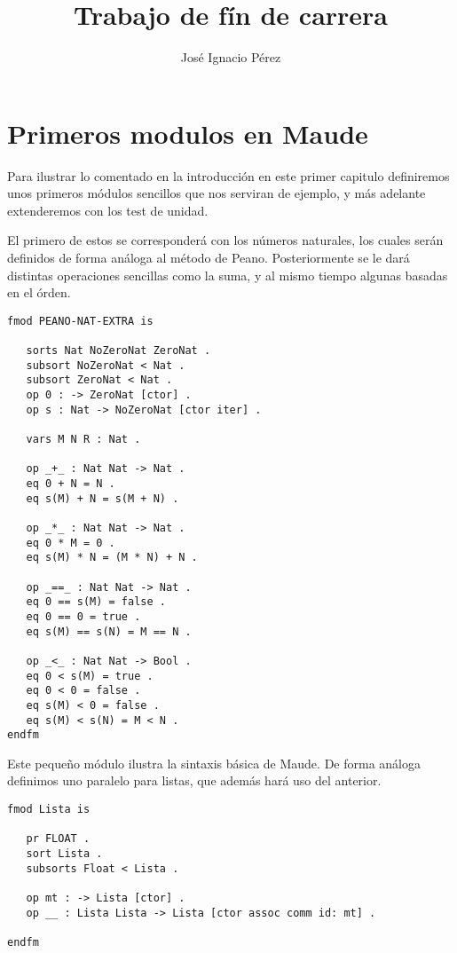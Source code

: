 \documentclass[12pt,a4paper]{book}
\author{Jos\'e Ignacio P\'erez}
\title{Trabajo de f\'in de carrera}
\begin{document}
\newcommand{\codesize}{\small}

\tableofcontents

\chapter{Primeros modulos en Maude}\label{cap.1}
Para ilustrar lo comentado en la introducción en este primer capitulo definiremos unos primeros m\'odulos sencillos que nos serviran de ejemplo, y m\'as adelante extenderemos con los test de unidad. \par
El primero de estos se corresponder\'a con los números naturales, los cuales ser\'an definidos de forma an\'aloga al m\'etodo de Peano. Posteriormente se le dar\'a distintas operaciones sencillas como la suma, y al mismo tiempo algunas basadas en el \'orden.\par

{\codesize
\begin{verbatim}
fmod PEANO-NAT-EXTRA is

   sorts Nat NoZeroNat ZeroNat .
   subsort NoZeroNat < Nat .
   subsort ZeroNat < Nat .
   op 0 : -> ZeroNat [ctor] .
   op s : Nat -> NoZeroNat [ctor iter] .

   vars M N R : Nat .

   op _+_ : Nat Nat -> Nat .
   eq 0 + N = N .
   eq s(M) + N = s(M + N) .

   op _*_ : Nat Nat -> Nat .
   eq 0 * M = 0 .
   eq s(M) * N = (M * N) + N .
	
   op _==_ : Nat Nat -> Nat .
   eq 0 == s(M) = false .
   eq 0 == 0 = true .
   eq s(M) == s(N) = M == N .
	
   op _<_ : Nat Nat -> Bool .
   eq 0 < s(M) = true .
   eq 0 < 0 = false .
   eq s(M) < 0 = false .
   eq s(M) < s(N) = M < N .
endfm
\end{verbatim}
}

Este pequeño m\'odulo ilustra la sintaxis b\'asica de Maude. De forma an\'aloga definimos uno paralelo para listas, que adem\'as har\'a uso del anterior. \par

\begin{verbatim}
fmod Lista is

   pr FLOAT .
   sort Lista .
   subsorts Float < Lista .
	
   op mt : -> Lista [ctor] .
   op __ : Lista Lista -> Lista [ctor assoc comm id: mt] .

endfm
\end{verbatim}
\end{document}
